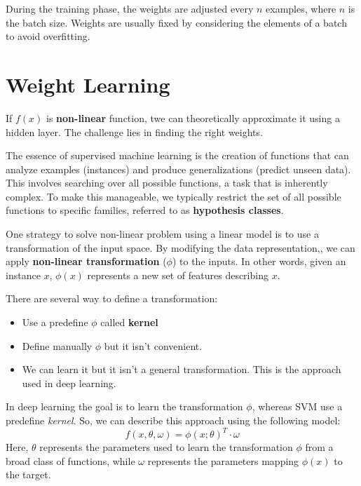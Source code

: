 \begin{note}
    During the training phase, the weights are adjusted every $n$ examples,
    where $n$ is the batch size. Weights are usually fixed by considering the
    elements of a batch to avoid overfitting.
\end{note}
\section{Weight Learning}
If $f(x)$ is \textbf{non-linear} function, twe can theoretically approximate it
using a hidden layer. The challenge lies in finding the right weights.

The essence of supervised machine learning is the creation of functions that can
analyze examples (instances) and produce generalizations (predict unseen data).
This involves searching over all possible functions, a task that is inherently
complex. To make this manageable, we typically restrict the set of all possible
functions to specific families, referred to as \textbf{hypothesis classes}.

One strategy to solve non-linear problem using a linear model is to use a
transformation of the input space. By modifying the data representation,, we can
apply \textbf{non-linear transformation} ($\phi$) to the inputs. In other words,
given an instance $x$, $\phi(x)$ represents a new set of features describing $x$.

There are several way to define a transformation:
\begin{itemize}
    \item Use a predefine $\phi$ called \textbf{kernel}
    \item Define manually $\phi$ but it isn't convenient.
    \item We can learn it but it isn't a general transformation. This is the
          approach used in deep learning.
\end{itemize}

In deep learning the goal is to learn the transformation $\phi$, whereas SVM use
a predefine \textit{kernel}. So, we can describe this approach using the
following model:
\begin{equation}
    f(x, \theta, \omega) = \phi(x; \theta)^T \cdot \omega
\end{equation}
Here, $\theta$ represents the parameters used to learn the transformation $\phi$
from a broad class of functions, while $\omega$ represents the parameters mapping
$\phi(x)$ to the target.

